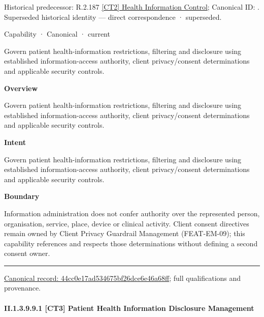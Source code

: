 {\small Historical predecessor: R.2.187 \hyperref[element:a3196aef21d443519de874c24f64a185]{[CT2] Health Information Control}; Canonical ID: \texttt{}. Superseded historical identity — direct correspondence · superseded.}\par
\label{element:44cc0e17ad534675bf26dce6e46a68ff}
{\small Capability · Canonical · current}\par

Govern patient health-information restrictions, filtering and disclosure using established information-access authority, client privacy/consent determinations and applicable security controls.



\textbf{Overview}



Govern patient health-information restrictions, filtering and disclosure using established information-access authority, client privacy/consent determinations and applicable security controls.



\textbf{Intent}



Govern patient health-information restrictions, filtering and disclosure using established information-access authority, client privacy/consent determinations and applicable security controls.



\textbf{Boundary}



Information administration does not confer authority over the represented person, organisation, service, place, device or clinical activity. Client consent directives remain owned by Client Privacy Guardrail Management (FEAT-EM-09); this capability references and respects those determinations without defining a second consent owner.



\medskip\hrule\medskip

{\footnotesize \href{../../../../continuum/strategy/capability/44cc0e17ad534675bf26dce6e46a68ff.md}{Canonical record: 44cc0e17ad534675bf26dce6e46a68ff}; full qualifications and provenance.}\par
\paragraph*{II.1.3.9.9.1 [CT3] Patient Health Information Disclosure Management}
\label{navigation:II.1.3.9.9.1}

